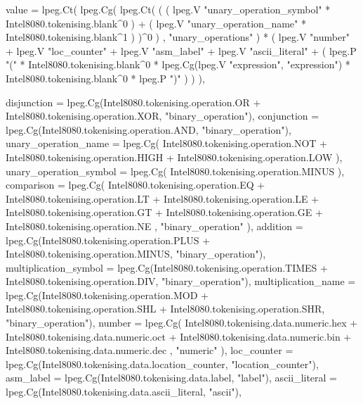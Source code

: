 {        value = lpeg.Ct(
            lpeg.Cg(
                lpeg.Ct(
                    (
                        (
                            lpeg.V "unary_operation_symbol"
                            * Intel8080.tokenising.blank^0
                        )
                        +
                        (
                            lpeg.V "unary_operation_name"
                            * Intel8080.tokenising.blank^1
                        )
                    )^0
                )
                , "unary_operations"
            )
            * (
                lpeg.V "number"
                + lpeg.V "loc_counter"
                + lpeg.V "asm_label"
                + lpeg.V "ascii_literal"
                + (
                    lpeg.P "("
                    * Intel8080.tokenising.blank^0
                    * lpeg.Cg(lpeg.V "expression", "expression")
                    * Intel8080.tokenising.blank^0
                    * lpeg.P ")"
                )
            )
        ),

        disjunction = lpeg.Cg(Intel8080.tokenising.operation.OR + Intel8080.tokenising.operation.XOR, "binary_operation"),
        conjunction = lpeg.Cg(Intel8080.tokenising.operation.AND, "binary_operation"),
        unary_operation_name = lpeg.Cg(
            Intel8080.tokenising.operation.NOT
            + Intel8080.tokenising.operation.HIGH
            + Intel8080.tokenising.operation.LOW
        ),
        unary_operation_symbol = lpeg.Cg(
            Intel8080.tokenising.operation.MINUS
        ),
        comparison = lpeg.Cg(
            Intel8080.tokenising.operation.EQ
            + Intel8080.tokenising.operation.LT
            + Intel8080.tokenising.operation.LE
            + Intel8080.tokenising.operation.GT
            + Intel8080.tokenising.operation.GE
            + Intel8080.tokenising.operation.NE
            , "binary_operation"
        ),
        addition = lpeg.Cg(Intel8080.tokenising.operation.PLUS + Intel8080.tokenising.operation.MINUS, "binary_operation"),
        multiplication_symbol = lpeg.Cg(Intel8080.tokenising.operation.TIMES + Intel8080.tokenising.operation.DIV, "binary_operation"),
        multiplication_name = lpeg.Cg(Intel8080.tokenising.operation.MOD + Intel8080.tokenising.operation.SHL + Intel8080.tokenising.operation.SHR, "binary_operation"),
        number = lpeg.Cg(
            Intel8080.tokenising.data.numeric.hex
            + Intel8080.tokenising.data.numeric.oct
            + Intel8080.tokenising.data.numeric.bin
            + Intel8080.tokenising.data.numeric.dec
            , "numeric"
        ),
        loc_counter = lpeg.Cg(Intel8080.tokenising.data.location_counter, "location_counter"),
        asm_label = lpeg.Cg(Intel8080.tokenising.data.label, "label"),
        ascii_literal = lpeg.Cg(Intel8080.tokenising.data.ascii_literal, "ascii"),
    }

